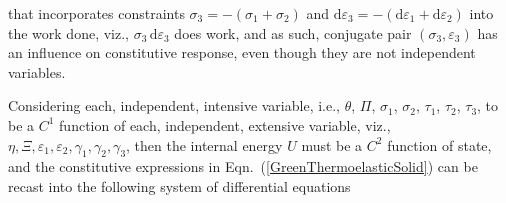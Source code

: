 that incorporates constraints $\sigma_3 = -(\sigma_1 + \sigma_2)$ and $\mathrm{d} \varepsilon_3 = -( \mathrm{d} \varepsilon_1 + \mathrm{d} \varepsilon_2 )$ into the work done, viz., $\sigma_3 \, \mathrm{d} \varepsilon_3$ does work, and as such, conjugate pair $( \sigma_3 , \varepsilon_3 )$ has an influence on constitutive response, even though they are not independent variables.

Considering each, independent, intensive variable, i.e., $\theta$, $\Pi$, $\sigma_1$, $\sigma_2$, $\tau_1$, $\tau_2$, $\tau_3$, to be a $C^1$ function of each, independent, extensive variable, viz., $\eta , \Xi , \varepsilon_1 , \varepsilon_2 , \gamma_1 , \gamma_2 , \gamma_3 $, then the internal energy $U$ must be a $C^2$ function of state, and the constitutive expressions in Eqn.~(\ref{GreenThermoelasticSolid}) can be recast into the following system of differential equations
\footnotesize
